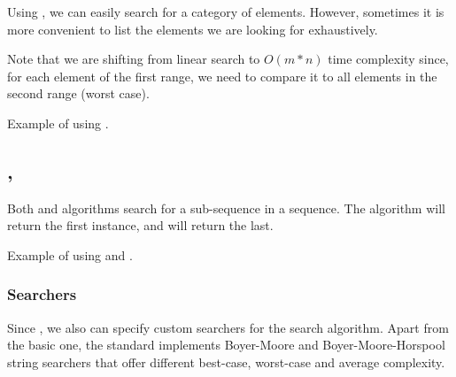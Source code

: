 Using , we can easily search for a category of elements. However, sometimes it is more convenient to list the elements we are looking for exhaustively.


Note that we are shifting from linear search to $O(m*n)$ time complexity since, for each element of the first range, we need to compare it to all elements in the second range (worst case).

\begin{box-note}
\footnotesize Example of using .
\tcblower
{}
\end{box-note}

\subsection{\texorpdfstring{, }{\texttt{std::search}, \texttt{std::find\_end}}}

Both  and  algorithms search for a sub-sequence in a sequence.
The  algorithm will return the first instance, and  will return the last.


\begin{box-note}
\footnotesize Example of using  and .
\tcblower
{}
\end{box-note}

\subsubsection{Searchers}

Since , we also can specify custom searchers for the search algorithm. Apart from the basic one, the standard implements Boyer-Moore and Boyer-Moore-Horspool string searchers that offer different best-case, worst-case and average complexity.

